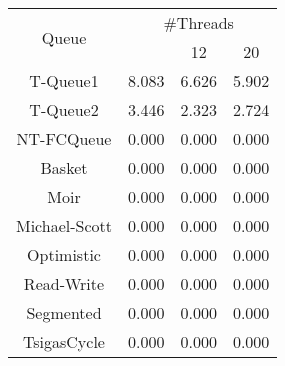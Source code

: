 \begin{tabular}{|c|c|c|c|}
\hline
\multirow{2}{*}{Queue} & \multicolumn{3}{c|}{\#Threads}\\\cline{2-4}& \quad 4 & 12 & 20\\
\hline
\hline
T-Queue1 & 8.083 & 6.626 & 5.902\\
T-Queue2 & 3.446 & 2.323 & 2.724\\
NT-FCQueue & 0.000 & 0.000 & 0.000\\
Basket & 0.000 & 0.000 & 0.000\\
Moir & 0.000 & 0.000 & 0.000\\
Michael-Scott & 0.000 & 0.000 & 0.000\\
Optimistic & 0.000 & 0.000 & 0.000\\
Read-Write & 0.000 & 0.000 & 0.000\\
Segmented & 0.000 & 0.000 & 0.000\\
TsigasCycle & 0.000 & 0.000 & 0.000\\
\hline\end{tabular}
